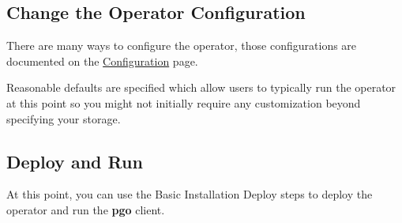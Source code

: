\documentclass[letterpaper,12pt]{article}
\begin{document}
\subsection{Change the Operator Configuration}\label{/_custom_installation/_change_the_operator_configuration}

There are many ways to configure the operator, those configurations are documented on the \href{docs/configuration.asciidoc}{Configuration} page.

Reasonable defaults are specified which allow users to typically run the operator at this point so you might not initially require any customization beyond specifying your storage.

\subsection{Deploy and Run}\label{/_custom_installation/_deploy_and_run}

At this point, you can use the Basic Installation Deploy steps to deploy the operator and run the \textbf{pgo} client.

\end{document}
